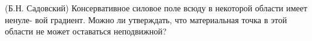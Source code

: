 (Б.Н. Садовский)
Консервативное силовое поле всюду в некоторой области имеет ненуле-
вой градиент. Можно ли утверждать, что материальная точка в этой области
не может оставаться неподвижной?
